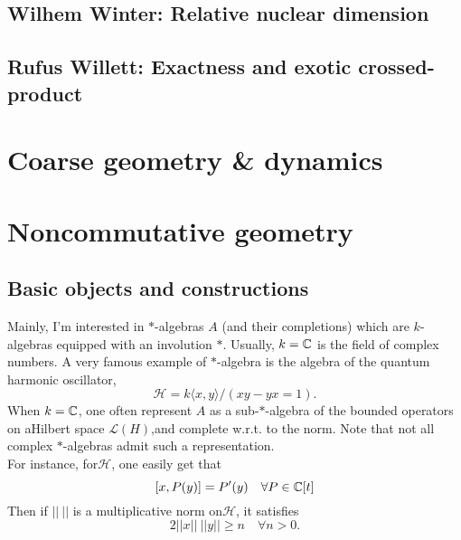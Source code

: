 \subsection{Wilhem Winter: Relative nuclear dimension}

\subsection{Rufus Willett: Exactness and exotic crossed-product}

\section{Coarse geometry \& dynamics}


\section{Noncommutative geometry}

\subsection{Basic objects and constructions}

Mainly, I'm interested in $*$-algebras $A$ (and their completions) which are $k$-algebras equipped with an involution $*$. Usually, $k=\mathbb C$ is the field of complex numbers. A very famous example of $*$-algebra is the algebra of the quantum harmonic oscillator,
\[\mathcal H = k\langle x, y\rangle / (xy -yx = 1).\]
When $k=\mathbb C$, one often represent $A$ as a sub-$*$-algebra of the bounded operators on aHilbert space $\mathcal L(H)$,and complete w.r.t. to the norm. Note that not all complex $*$-algebras admit such a representation. \\

For instance, for$\mathcal H$, one easily get that 
\[[x,P(y)] = P'(y) \quad \forall P\in \mathbb C[t]\]
Then if $||\ ||$ is a multiplicative norm on$\mathcal H$, it satisfies
\[ 2 ||x|| \ ||y|| \geq n \quad \forall n>0.\]   

